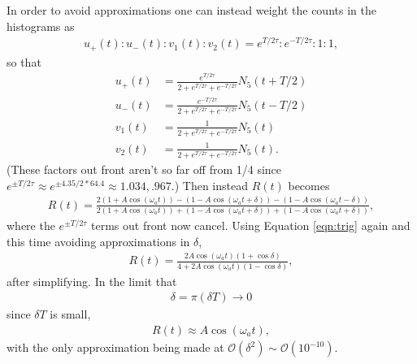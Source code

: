 In order to avoid approximations one can instead weight the counts in the histograms as
	\begin{align}
		u_{+}(t) : u_{-}(t) : v_{1}(t) : v_{2}(t) = e^{T/2\tau} : e^{-T/2\tau} : 1 : 1,		
	\end{align}
so that
	\begin{equation}
	\begin{aligned}
		u_{+}(t) &= \frac{e^{T/2\tau}}{2 + e^{T/2\tau} + e^{-T/2\tau}} N_{5}(t+T/2) \\
		u_{-}(t) &= \frac{e^{-T/2\tau}}{2 + e^{T/2\tau} + e^{-T/2\tau}} N_{5}(t-T/2) \\
		v_{1}(t) &= \frac{1}{2 + e^{T/2\tau} + e^{-T/2\tau}} N_{5}(t) \\
		v_{2}(t) &= \frac{1}{2 + e^{T/2\tau} + e^{-T/2\tau}} N_{5}(t).
	\label{eqn:fourHists}
	\end{aligned}
	\end{equation}
(These factors out front aren't so far off from 1/4 since $e^{\pm T/ 2\tau} \approx e^{\pm 4.35/ 2*64.4} \approx 1.034, .967$.) Then instead $R(t)$ becomes 
	\begin{align}
		R(t) = \frac{2(1 + A \cos(\omega_{a}t)) - (1 - A \cos(\omega_{a}t + \delta)) - (1 - A \cos(\omega_{a}t - \delta))} {2(1 + A \cos(\omega_{a}t)) + (1 - A \cos(\omega_{a}t + \delta)) + (1 - A \cos(\omega_{a}t + \delta))},
	\end{align}
where the $e^{\pm T/ 2\tau}$ terms out front now cancel. Using Equation \ref{eqn:trig} again and this time avoiding approximations in $\delta$,
	\begin{align}
		R(t) = \frac{2A \cos(\omega_{a}t) (1 + \cos{\delta} )} {4 + 2A \cos(\omega_{a}t) (1 - \cos{\delta} )},
	\end{align}
after simplifying. In the limit that 
	\begin{align}
		\delta = \pi (\delta T) \rightarrow 0
	\end{align}
since $\delta T$ is small, 
	\begin{align}
		R(t) \approx A \cos(\omega_{a}t),
	\end{align}
with the only approximation being made at $\mathcal{O}(\delta^{2}) \sim \mathcal{O}(10^{-10})$.

